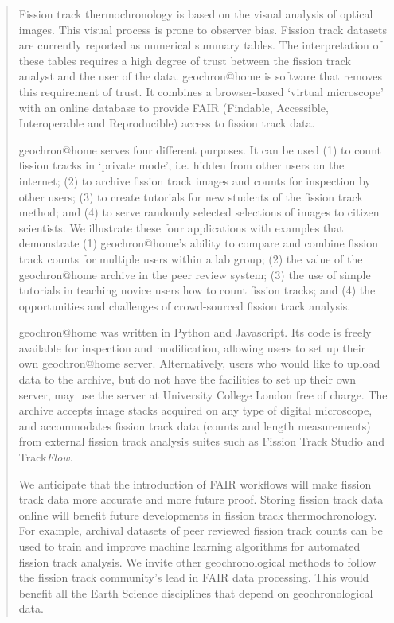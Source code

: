 \documentclass[gchron, manuscript]{copernicus}
\begin{document}
\begin{abstract}
Fission track thermochronology is based on the visual analysis of
optical images. This visual process is prone to observer bias. Fission
track datasets are currently reported as numerical summary tables. The
interpretation of these tables requires a high degree of trust between
the fission track analyst and the user of the data. geochron@home is
software that removes this requirement of trust. It combines a
browser-based `virtual microscope' with an online database to provide
FAIR (Findable, Accessible, Interoperable and Reproducible) access to
fission track data.\medskip

geochron@home serves four different purposes. It can be used (1) to
count fission tracks in `private mode', i.e. hidden from other users
on the internet; (2) to archive fission track images and counts for
inspection by other users; (3) to create tutorials for new students of
the fission track method; and (4) to serve randomly selected
selections of images to citizen scientists. We illustrate these four
applications with examples that demonstrate (1) geochron@home's
ability to compare and combine fission track counts for multiple users
within a lab group; (2) the value of the geochron@home archive in the
peer review system; (3) the use of simple tutorials in teaching novice
users how to count fission tracks; and (4) the opportunities and
challenges of crowd-sourced fission track analysis.\medskip

geochron@home was written in Python and Javascript. Its code is freely
available for inspection and modification, allowing users to set up
their own geochron@home server. Alternatively, users who would like to
upload data to the archive, but do not have the facilities to set up
their own server, may use the server at University College London free
of charge. The archive accepts image stacks acquired on any type of
digital microscope, and accommodates fission track data (counts and
length measurements) from external fission track analysis suites such
as Fission Track Studio and Track\emph{Flow}.\medskip

We anticipate that the introduction of FAIR workflows will make
fission track data more accurate and more future proof. Storing
fission track data online will benefit future developments in fission
track thermochronology. For example, archival datasets of peer
reviewed fission track counts can be used to train and improve machine
learning algorithms for automated fission track analysis. We invite
other geochronological methods to follow the fission track community's
lead in FAIR data processing. This would benefit all the Earth Science
disciplines that depend on geochronological data.
\end{abstract}
\end{document}
